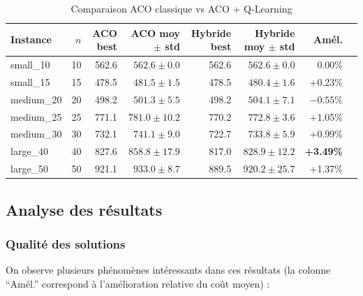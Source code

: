 \documentclass[12pt, a4paper]{article}
\begin{document}
\begin{table}[H]
\centering
\small   
\caption{Comparaison ACO classique vs ACO + Q-Learning}
\label{tab:results}
\begin{tabular}{l r r r r r r r}
\toprule
\textbf{Instance} & \textbf{$n$} & \textbf{ACO best} & \textbf{ACO moy $\pm$ std} & \textbf{Hybride best} & \textbf{Hybride moy $\pm$ std} & \textbf{Amél.} \\
\midrule
small\_10  & 10 & 562.6 & $562.6 \pm 0.0$ & 562.6 & $562.6 \pm 0.0$ & 0.00\% \\
small\_15  & 15 & 478.5 & $481.5 \pm 1.5$ & 478.5 & $480.4 \pm 1.6$ & +0.23\% \\
medium\_20 & 20 & 498.2 & $501.3 \pm 5.5$ & 498.2 & $504.1 \pm 7.1$ & $-0.55$\% \\
medium\_25 & 25 & 771.1 & $781.0 \pm 10.2$ & 770.2 & $772.8 \pm 3.6$ & +1.05\% \\
medium\_30 & 30 & 732.1 & $741.1 \pm 9.0$ & 722.7 & $733.8 \pm 5.9$ & +0.99\% \\
large\_40  & 40 & 827.6 & $858.8 \pm 17.9$ & 817.0 & $828.9 \pm 12.2$ & \textbf{+3.49\%} \\
large\_50  & 50 & 921.1 & $933.0 \pm 8.7$ & 889.5 & $920.2 \pm 25.7$ & +1.37\% \\
\bottomrule
\end{tabular}
\end{table}

\subsection{Analyse des résultats}

\subsubsection{Qualité des solutions}

On observe plusieurs phénomènes intéressants dans ces résultats (la colonne ``Amél.'' correspond à l'amélioration relative du coût moyen) :
\end{document}
